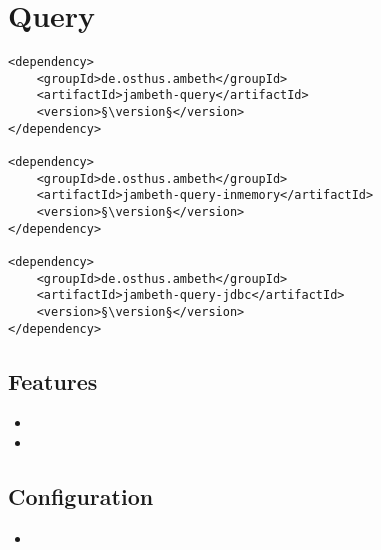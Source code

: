 \section{Query}
\label{module:Query}
\ClearAPI
\TODO
\begin{lstlisting}[style=POM,caption={Maven modules to use \emph{Ambeth Query}}]
<dependency>
	<groupId>de.osthus.ambeth</groupId>
	<artifactId>jambeth-query</artifactId>
	<version>§\version§</version>
</dependency>

<dependency>
	<groupId>de.osthus.ambeth</groupId>
	<artifactId>jambeth-query-inmemory</artifactId>
	<version>§\version§</version>
</dependency>

<dependency>
	<groupId>de.osthus.ambeth</groupId>
	<artifactId>jambeth-query-jdbc</artifactId>
	<version>§\version§</version>
</dependency>
\end{lstlisting}
\subsection{Features}
\begin{itemize}
	\item {}
	\item \TODO
\end{itemize}

\subsection{Configuration}
\begin{itemize}
	\item {}
\end{itemize}
